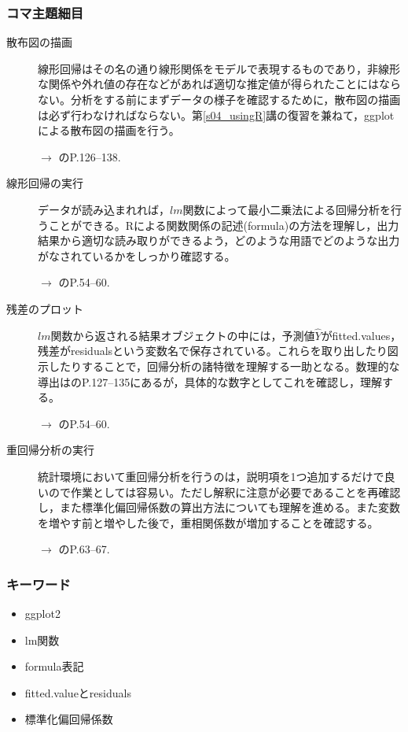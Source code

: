 \subsubsection{コマ主題細目}
\begin{description}

	\item[散布図の描画]線形回帰はその名の通り線形関係をモデルで表現するものであり，非線形な関係や外れ値の存在などがあれば適切な推定値が得られたことにはならない。分析をする前にまずデータの様子を確認するために，散布図の描画は必ず行わなければならない。第\ref{s04_usingR}講の復習を兼ねて，ggplotによる散布図の描画を行う。
	      \begin{flushright}
		      $\to$ \textcite{Kinosady2021}のP.126--138.
	      \end{flushright}

	\item[線形回帰の実行]データが読み込まれれば，$lm$関数によって最小二乗法による回帰分析を行うことができる。Rによる関数関係の記述(formula)の方法を理解し，出力結果から適切な読み取りができるよう，どのような用語でどのような出力がなされているかをしっかり確認する。
	      \begin{flushright}
		      $\to$ \textcite{kosugi2018}のP.54--60.
	      \end{flushright}

	\item[残差のプロット]$lm$関数から返される結果オブジェクトの中には，予測値$\hat{Y}$がfitted.values，残差がresidualsという変数名で保存されている。これらを取り出したり図示したりすることで，回帰分析の諸特徴を理解する一助となる。数理的な導出は\textcite{kosugi2018}のP.127--135にあるが，具体的な数字としてこれを確認し，理解する。
	      \begin{flushright}
		      $\to$ \textcite{kosugi2018}のP.54--60.
	      \end{flushright}

	\item[重回帰分析の実行]統計環境において重回帰分析を行うのは，説明項を1つ追加するだけで良いので作業としては容易い。ただし解釈に注意が必要であることを再確認し，また標準化偏回帰係数の算出方法についても理解を進める。また変数を増やす前と増やした後で，重相関係数が増加することを確認する。
	      \begin{flushright}
		      $\to$ \textcite{kosugi2018}のP.63--67.
	      \end{flushright}

\end{description}
\subsubsection{キーワード}
\begin{itemize}
	\item ggplot2
	\item lm関数
	\item formula表記
	\item fitted.valueとresiduals
	\item 標準化偏回帰係数
\end{itemize}
